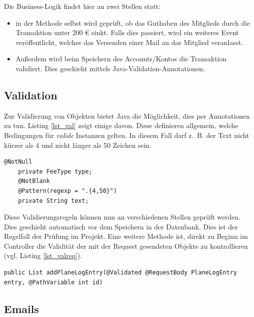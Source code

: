 \documentclass[a4paper, 11pt]{article}
\providecommand{\tightlist}{%
  \setlength{\itemsep}{0pt}\setlength{\parskip}{0pt}}
\begin{document}
Die Business-Logik findet hier an zwei Stellen statt:

\begin{itemize}
    \tightlist
    \item in der Methode selbst wird geprüft, ob das Guthaben des Mitglieds
        durch die Transaktion unter 200 \euro{} sinkt. Falls dies passiert, wird ein
        weiteres Event veröffentlicht, welches das Versenden einer Mail an das
        Mitglied veranlasst.
    \item Außerdem wird beim Speichern des Accounts/Kontos die Transaktion
        validiert. Dies geschieht mittels Java-Validation-Annotationen.
\end{itemize}

\subsection{Validation}

Zur Validierung von Objekten bietet Java die Möglichkeit, dies per Annotationen
zu tun. Listing \ref{lst_val} zeigt einige davon. Diese definieren allgemein,
welche Bedingungen für \emph{valide} Instanzen gelten. In diesem Fall darf
z.~B. der Text nicht kürzer als 4 und nicht länger als 50 Zeichen sein. 

\begin{lstlisting}[caption=Validierung von Business-Objekten per Annotation, label=lst_val]
    @NotNull
    private FeeType type;
    @NotBlank
    @Pattern(regexp = ".{4,50}")
    private String text;
\end{lstlisting}

Diese Validierungsregeln können nun an verschiedenen Stellen geprüft werden.
Dies geschieht automatisch vor dem Speichern in der Datenbank. Dies ist der
Regelfall der Prüfung im Projekt. Eine weitere Methode ist, direkt zu Beginn im
Controller die Validität der mit der Request gesendeten Objekte zu kontrollieren (vgl. Listing \ref{lst_valreq}).

\begin{lstlisting}[caption=Beispiel für Validierung von Request-Parametern, label=lst_valreq]
public List addPlaneLogEntry(@Validated @RequestBody PlaneLogEntry entry, @PathVariable int id)
\end{lstlisting}

\subsection{Emails}
\end{document}
